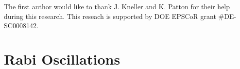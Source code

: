 \documentclass[%
reprint,
 amsmath,amssymb,
 prd,
]{revtex4-1}
\begin{document}
The first author would like to thank J. Kneller and K. Patton for their help during this research. This reseach is supported by DOE EPSCoR grant \#DE-SC0008142.









\appendix


\section{\label{sec:rabi-oscillations}Rabi Oscillations}

\end{document}
